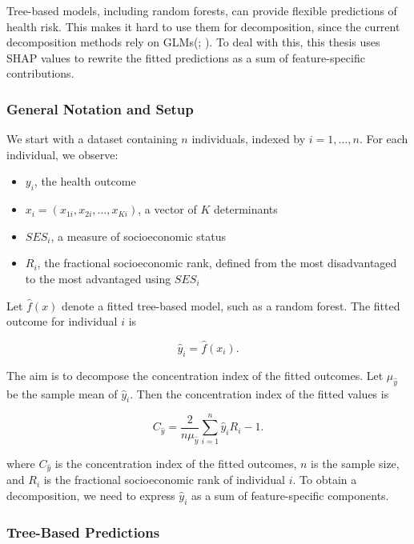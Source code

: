 \documentclass[
  11pt,
  a4paper,
]{article}
\providecommand{\tightlist}{%
  \setlength{\itemsep}{0pt}\setlength{\parskip}{0pt}}
\begin{document}
Tree-based models, including random forests, can provide flexible
predictions of health risk. This makes it hard to use them for
decomposition, since the current decomposition methods rely on
GLMs(; ). To deal with this, this thesis uses SHAP values
to rewrite the fitted predictions as a sum of feature-specific
contributions.

\subsubsection{General Notation and Setup}\label{sec-decomp-setup}

We start with a dataset containing \(n\) individuals, indexed by
\(i = 1, \dots, n\). For each individual, we observe:

\begin{itemize}
\tightlist
\item
  \(y_i\), the health outcome
\item
  \(x_i = (x_{1i}, x_{2i}, \dots, x_{Ki})\), a vector of \(K\)
  determinants
\item
  \(SES_i\), a measure of socioeconomic status
\item
  \(R_i\), the fractional socioeconomic rank, defined from the most
  disadvantaged to the most advantaged using \(SES_i\)
\end{itemize}

Let \(\hat{f}(x)\) denote a fitted tree-based model, such as a random
forest. The fitted outcome for individual \(i\) is

\[
\hat{y}_i = \hat{f}(x_i).
\]

The aim is to decompose the concentration index of the fitted outcomes.
Let \(\mu_{\hat{y}}\) be the sample mean of \(\hat{y}_i\). Then the
concentration index of the fitted values is

\[
C_{\hat{y}} = \frac{2}{n\mu_{\hat{y}}}\sum_{i=1}^{n} \hat{y}_i R_i - 1.
\]

where \(C_{\hat{y}}\) is the concentration index of the fitted outcomes,
\(n\) is the sample size, and \(R_i\) is the fractional socioeconomic
rank of individual \(i\). To obtain a decomposition, we need to express
\(\hat{y}_i\) as a sum of feature-specific components.

\subsubsection{Tree-Based Predictions}\label{sec-tree-predictions}
\end{document}
